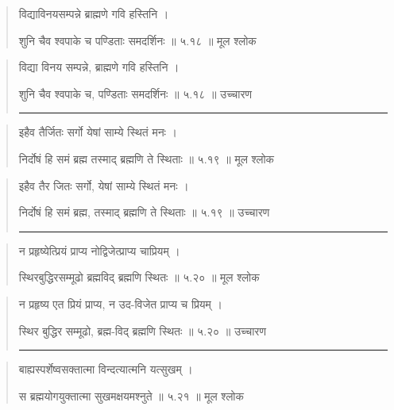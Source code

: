 \begin{quotation}  

विद्याविनयसम्पन्ने ब्राह्मणे गवि हस्तिनि  ।  

शुनि चैव श्वपाके च पण्डिताः समदर्शिनः  ॥ ५.१८ ॥  मूल श्लोक
\end{quotation}

\begin{quotation}

विद्या विनय सम्पन्ने, ब्राह्मणे गवि हस्तिनि  ।  

शुनि चैव श्वपाके च, पण्डिताः समदर्शिनः  ॥ ५.१८ ॥  उच्चारण

\noindent\rule{16cm}{0.4pt} 
\end{quotation}


\begin{quotation}  

इहैव तैर्जितः सर्गो येषां साम्ये स्थितं मनः  ।  

निर्दोषं हि समं ब्रह्म तस्माद् ब्रह्मणि ते स्थिताः  ॥ ५.१९ ॥  मूल श्लोक
\end{quotation}

\begin{quotation}

इहैव तैर जितः सर्गो, येषां साम्ये स्थितं मनः  ।  

निर्दोषं हि समं ब्रह्म, तस्माद् ब्रह्मणि ते स्थिताः  ॥ ५.१९ ॥  उच्चारण

\noindent\rule{16cm}{0.4pt} 
\end{quotation}


\begin{quotation}  

न प्रहृष्येत्प्रियं प्राप्य नोद्विजेत्प्राप्य चाप्रियम्‌  ।  

स्थिरबुद्धिरसम्मूढो ब्रह्मविद् ब्रह्मणि स्थितः  ॥ ५.२० ॥  मूल श्लोक
\end{quotation}

\begin{quotation}

न प्रहृष्य एत प्रियं प्राप्य, न उद-विजेत प्राप्य च प्रियम्‌  ।  

स्थिर बुद्धिर सम्मूढो, ब्रह्म-विद् ब्रह्मणि स्थितः  ॥ ५.२० ॥  उच्चारण

\noindent\rule{16cm}{0.4pt} 
\end{quotation}


\begin{quotation}  

बाह्यस्पर्शेष्वसक्तात्मा विन्दत्यात्मनि यत्सुखम्‌  ।  

स ब्रह्मयोगयुक्तात्मा सुखमक्षयमश्नुते  ॥ ५.२१ ॥  मूल श्लोक
\end{quotation}

